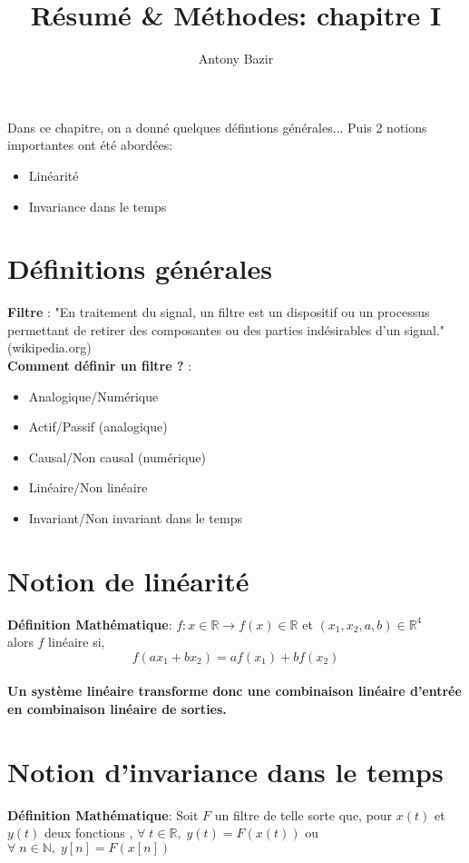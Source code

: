 \documentclass[11pt,a4paper]{article}
\begin{document}
\title{Résumé \& Méthodes: chapitre I}
\author{Antony Bazir}
\maketitle
Dans ce chapitre, on a donné quelques défintions générales... Puis 2 notions importantes ont été abordées:
\begin{itemize}
\item  Linéarité 
\item Invariance dans le temps
\end{itemize} 

\section{Définitions générales}
\textbf{Filtre} : "En traitement du signal, un filtre est un dispositif ou un processus permettant de retirer des composantes ou des parties indésirables d'un signal." (wikipedia.org)\\

\textbf{Comment définir un filtre ?} :
\begin{itemize}
\item Analogique/Numérique
\item Actif/Passif (analogique)
\item Causal/Non causal (numérique)
\item Linéaire/Non linéaire 
\item Invariant/Non invariant dans le temps
\end{itemize}

\section{Notion de linéarité}
\textbf{Définition Mathématique}:  $f : x \in \mathbb{R} \rightarrow f(x) \in \mathbb{R} $ et $(x_1,x_2,a,b) \in \mathbb{R}^4$ \\ alors $f$ linéaire si, \\

\[\boxed{f(a x_1 + b x_2) = a f(x_1) + b f(x_2)}\]
\vspace{0.2cm}\\
\textbf{Un système linéaire transforme donc une combinaison linéaire d'entrée en combinaison linéaire de sorties.}\\

\newpage
\section{Notion d'invariance dans le temps}
\textbf{Définition Mathématique}:
Soit $F$ un filtre de telle sorte que, pour $x(t)$ et $y(t)$ deux fonctions , $ \forall \; t \in \mathbb{R}, \; y(t) = F(x(t))$ ou $ \forall \; n \in \mathbb{N}, \; y[n] = F(x[n])$ \\
\end{document}
